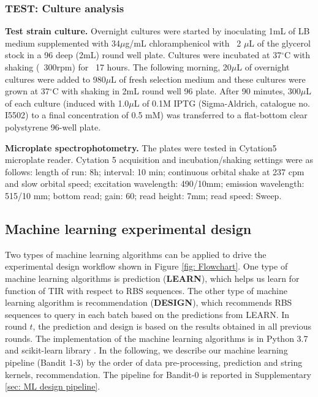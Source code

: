 \subsubsection{TEST: Culture analysis}

\textbf{Test strain culture.}
Overnight cultures were started by inoculating 1mL of LB medium supplemented with 34$\mu$g/mL chloramphenicol with ~2 $\mu$L of the glycerol stock in a 96 deep (2mL) round well plate.
Cultures were incubated at 37$^{\circ}$C with shaking (~300rpm) for ~17 hours. 
The following morning, 20$\mu$L of overnight cultures were added to 980$\mu$L of fresh selection medium and these cultures were grown at 37$^{\circ}$C with shaking in 2mL round well 96 plate. 
After 90 minutes, 300$\mu$L of each culture (induced with 1.0$\mu$L of 0.1M IPTG (Sigma-Aldrich, catalogue no. I5502) to a final concentration of 0.5 mM) was transferred to a flat-bottom clear polystyrene 96-well plate.

\textbf{Microplate spectrophotometry.}
The plates were tested in Cytation5 microplate reader.
Cytation 5 acquisition and incubation/shaking settings were as follows: length of run: 8h; interval: 10 min; continuous orbital shake at 237 cpm and slow orbital speed; excitation wavelength: 490/10mm; emission wavelength: 515/10 mm; bottom read; gain: 60; read height: 7mm; read speed: Sweep.

\subsection{Machine learning experimental design}

Two types of machine learning algorithms can be applied to drive the experimental design workflow shown in Figure \ref{fig: Flowchart}.
One type of machine learning algorithms is prediction (\textbf{LEARN}), which helps us learn for function of TIR with respect to RBS sequences. The other type of machine learning algorithm is recommendation (\textbf{DESIGN}), which recommends RBS sequences to query in each batch based on the predictions from LEARN. 
In round $t$, the prediction and design is based on the results obtained in all previous rounds. 
The implementation of the machine learning algorithms is in Python 3.7 and scikit-learn library \cite{scikit-learn}. 
In the following, we describe our machine learning pipeline (Bandit 1-3) by the order of data pre-processing, prediction and string kernels, recommendation. 
The pipeline for Bandit-0 is reported in Supplementary \ref{sec: ML design pipeline}.

